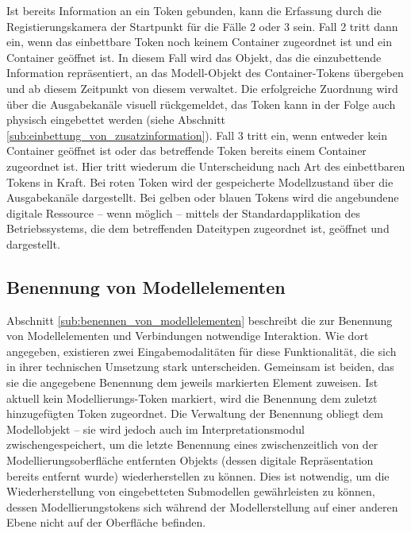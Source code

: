 Ist bereits Information an ein Token gebunden, kann die Erfassung durch die Registierungskamera der Startpunkt für die Fälle 2 oder 3 sein. Fall 2 tritt dann ein, wenn das einbettbare Token noch keinem Container zugeordnet ist und ein Container geöffnet ist. In diesem Fall wird das Objekt, das die einzubettende Information repräsentiert, an das Modell-Objekt des Container-Tokens übergeben und ab diesem Zeitpunkt von diesem verwaltet. Die erfolgreiche Zuordnung wird über die Ausgabekanäle visuell rückgemeldet, das Token kann in der Folge auch physisch eingebettet werden (siehe Abschnitt \ref{sub:einbettung_von_zusatzinformation}). Fall 3 tritt ein, wenn entweder kein Container geöffnet ist oder das betreffende Token bereits einem Container zugeordnet ist. Hier tritt wiederum die Unterscheidung nach Art des einbettbaren Tokens in Kraft. Bei roten Token wird der gespeicherte Modellzustand über die Ausgabekanäle dargestellt. Bei gelben oder blauen Tokens wird die angebundene digitale Ressource -- wenn möglich -- mittels der Standardapplikation des Betriebssystems, die dem betreffenden Dateitypen zugeordnet ist, geöffnet und dargestellt.


\subsection{Benennung von Modellelementen} %
\label{sub:benennung_von_modellelementen}

Abschnitt \ref{sub:benennen_von_modellelementen} beschreibt die zur Benennung von Modellelementen und Verbindungen notwendige Interaktion. Wie dort angegeben, existieren zwei Eingabemodalitäten für diese Funktionalität, die sich in ihrer technischen Umsetzung stark unterscheiden. Gemeinsam ist beiden, das sie die angegebene Benennung dem jeweils markierten Element zuweisen. Ist aktuell kein Modellierungs-Token markiert, wird die Benennung dem zuletzt hinzugefügten Token zugeordnet. Die Verwaltung der Benennung obliegt dem Modellobjekt -- sie wird jedoch auch im Interpretationsmodul zwischengespeichert, um die letzte Benennung eines zwischenzeitlich von der Modellierungsoberfläche entfernten Objekts (dessen digitale Repräsentation bereits entfernt wurde) wiederherstellen zu können. Dies ist notwendig, um die Wiederherstellung von eingebetteten Submodellen gewährleisten zu können, dessen Modellierungstokens sich während der Modellerstellung auf einer anderen Ebene nicht auf der Oberfläche befinden. 

